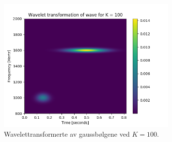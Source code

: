 \documentclass[11pt,norsk]{article}
\begin{document}
\begin{figure}[H]
\centering
\includegraphics[width=0.8\textwidth]{fig/wavelet_gaussian_k=100.png}
\caption{Wavelettransformerte av gaussbølgene ved $K = 100$.}
\label{fig:wavelet_gaussian_wave2}
\end{figure}
\end{document}
